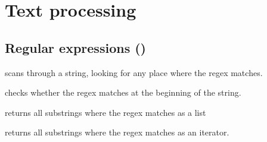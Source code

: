 \section{Text processing}
\subsection{Regular expressions ()}
\begin{compactitem}
	\item {} scans through a string, looking for any
place where the regex matches.
	\item {} checks whether the regex matches at the
beginning of the string.
	\item {} returns all substrings where the regex
matches as a list
	\item {} returns all substrings where the regex
matches as an iterator.
\end{compactitem}